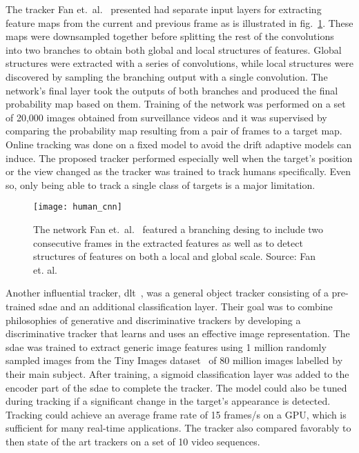 The tracker Fan et.~al.~\cite{HUMAN_CNN} presented had separate input layers for extracting feature maps from the current and previous frame as is illustrated in fig.~\ref{fig:human_cnn}. These maps were downsampled together before splitting the rest of the convolutions into two branches to obtain both global and local structures of features. Global structures were extracted with a series of convolutions, while local structures were discovered by sampling the branching output with a single convolution. The network's final layer took the outputs of both branches and produced the final probability map based on them. Training of the network was performed on a set of 20,000 images obtained from surveillance videos and it was supervised by comparing the probability map resulting from a pair of frames to a target map. Online tracking was done on a fixed model to avoid the drift adaptive models can induce. The proposed tracker performed especially well when the target's position or the view changed as the tracker was trained to track humans specifically. Even so, only being able to track a single class of targets is a major limitation.~\cite{HUMAN_CNN}

\begin{figure}[H]
\centering
\texttt{[image: human\_cnn]}
\caption{The network Fan et.~al.~\cite{HUMAN_CNN} featured a branching desing to include two consecutive frames in the extracted features as well as to detect structures of features on both a local and global scale. Source: Fan et. al.~\cite{HUMAN_CNN}}\label{fig:human_cnn}
\end{figure}

Another influential tracker, \ac{dlt}~\cite{DLT}, was a general object tracker consisting of a pre-trained \ac{sdae} and an additional classification layer. Their goal was to combine philosophies of generative and discriminative trackers by developing a discriminative tracker that learns and uses an effective image representation. The \ac{sdae} was trained to extract generic image features using 1 million randomly sampled images from the Tiny Images dataset~\cite{TINY_IMAGES} of 80 million images labelled by their main subject. After training, a sigmoid classification layer was added to the encoder part of the \ac{sdae} to complete the tracker. The model could also be tuned during tracking if a significant change in the target's appearance is detected. Tracking could achieve an average frame rate of 15 frames/s on a GPU, which is sufficient for many real-time applications. The tracker also compared favorably to then state of the art trackers on a set of 10 video sequences.~\cite{DLT}

